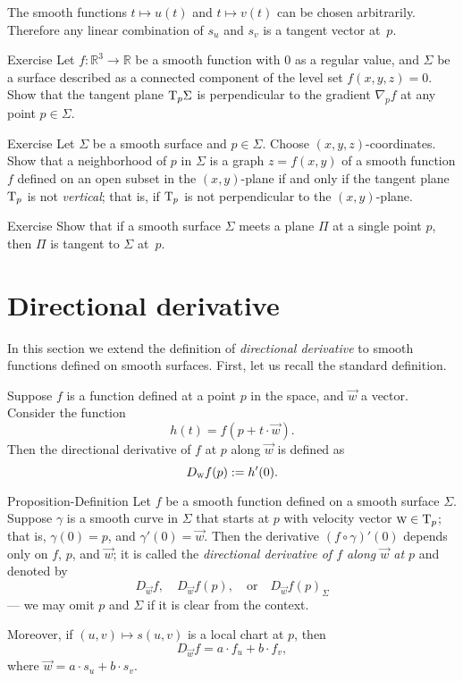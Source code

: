 The smooth functions $t\mapsto u(t)$ and $t\mapsto v(t)$ can be chosen arbitrarily.
Therefore any linear combination of $s_u$ and $s_v$ is a tangent vector at~$p$. 
\qeds


\begin{thm}{Exercise}\label{ex:tangent-normal}
Let $f:\mathbb{R}^3\to\mathbb{R}$ be a smooth function with $0$ as a regular value, and $\Sigma$ be a surface described as a connected component of the level set $f(x,y,z)=0$.
Show that the tangent plane $\mathrm{T}_p\Sigma$ is perpendicular to the gradient $\nabla_pf$ at any point $p\in\Sigma$.
\end{thm}

\begin{thm}{Exercise}\label{ex:vertical-tangent}
Let $\Sigma$ be a smooth surface and $p\in\Sigma$.
Choose $(x,y,z)$-coordinates.
Show that a neighborhood of $p$ in $\Sigma$ is a graph $z=f(x,y)$ of a smooth function $f$ defined on an open subset in the $(x,y)$-plane if and only if the tangent plane $\mathrm{T}_p$ is not {}\emph{vertical}; that is, if $\mathrm{T}_p$ is not perpendicular to the $(x,y)$-plane.
\end{thm}

\begin{thm}{Exercise}\label{ex:tangent-single-point}
Show that if a smooth surface $\Sigma$ meets a plane $\Pi$ at a single point $p$, then $\Pi$ is tangent to $\Sigma$ at~$p$.
\end{thm}


\section{Directional derivative}\label{sec:dirder}

In this section we extend the definition of {}\emph{directional derivative} to smooth functions defined on smooth surfaces.
First, let us recall the standard definition.

Suppose $f$ is a function defined at a point $p$ in the space, and $\vec w$ a vector.
Consider the function
\[h(t)=f(p+t\cdot\vec w).\]
Then the directional derivative of $f$ at $p$ along $\vec w$ is defined as 
\[D_{\text{\sc{w}}}f(p)\mathrel{:=} h'(0).\]

\begin{thm}{Proposition-Definition}\label{def:directional-derivative}
Let $f$ be a smooth function defined on a smooth surface $\Sigma$.
Suppose $\gamma$ is a smooth curve in $\Sigma$ that starts at $p$ with velocity vector $\text{\sc{w}}\in \mathrm{T}_p$;
that is, $\gamma(0)=p$, and $\gamma'(0)=\vec{w}$.
Then the derivative $(f\circ\gamma)'(0)$
depends only on $f$, $p$, and $\vec{w}$;
it is called the \emph{directional derivative of $f$ along $\vec{w}$ at $p$}
and denoted by
\[D_{\vec{w}}f,\quad D_{\vec{w}}f(p), \quad\text{or}\quad D_{\vec{w}}f(p)_\Sigma\] 
--- we may omit $p$ and $\Sigma$ if it is clear from the context.

Moreover, if $(u,v)\mapsto s(u,v)$ is a local chart at $p$, then 
\[D_{\vec{w}}f=a\cdot f_u+b\cdot f_v,\]
where $\vec{w}=a\cdot s_u +b\cdot s_v$. 
\end{thm}

